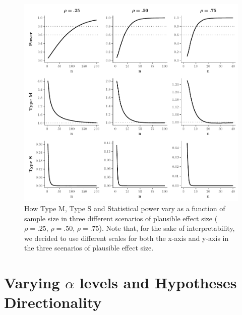 \documentclass{article}\usepackage[]{graphicx}\usepackage[]{color}
\makeatletter
\def\maxwidth{ %
  \ifdim\Gin@nat@width>\linewidth
    \linewidth
  \else
    \Gin@nat@width
  \fi
}
\newenvironment{knitrout}{}{} %
\makeatother
\begin{document}
\begin{knitrout}
\color{fgcolor}\begin{figure}[!h]

{\centering \includegraphics[width=\maxwidth]{figure/Plot_scenarios-1} 

}

\caption[How Type M, Type S and Statistical power vary as a function of sample size in three different scenarios of plausible effect size ($\rho=.25$, $\rho=.50$, $\rho=.75$)]{How Type M, Type S and Statistical power vary as a function of sample size in three different scenarios of plausible effect size ($\rho=.25$, $\rho=.50$, $\rho=.75$). Note that, for the sake of interpretability, we decided to use different scales for both the x-axis and y-axis in the three scenarios of plausible effect size.}\label{fig:Plot_scenarios}
\end{figure}


\end{knitrout}


\section{Varying $\alpha$ levels and Hypotheses Directionality}
\end{document}
